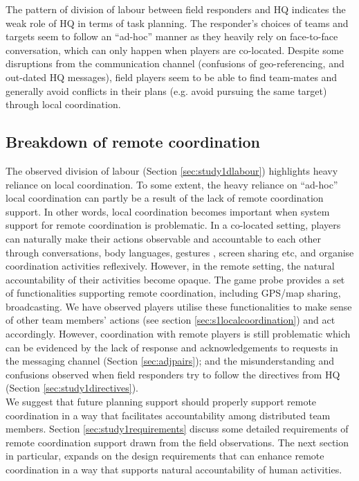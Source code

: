 The pattern of division of labour between field responders and HQ indicates the weak role of HQ in terms of task planning. The responder's choices of teams and targets seem to follow an ``ad-hoc'' manner as they heavily rely on face-to-face conversation, which can only happen when players are co-located. Despite some disruptions from the communication channel (confusions of geo-referencing, and out-dated HQ messages), field players seem to be able to find team-mates and generally avoid conflicts in their plans (e.g. avoid pursuing the same target) through local coordination. 


\subsection{Breakdown of remote coordination}\label{sec:study1breakdown}
The observed division of labour (Section \ref{sec:study1dlabour}) highlights heavy reliance on local coordination. To some extent, the heavy reliance on ``ad-hoc'' local coordination can partly be a result of the lack of remote coordination support. In other words, local coordination becomes important when system support for remote coordination is problematic. In a co-located setting, players can naturally make their actions observable and accountable to each other through conversations, body languages, gestures , screen sharing etc, and organise coordination activities reflexively. However, in the remote setting, the natural accountability of their activities become opaque. The game probe provides a set of functionalities supporting remote coordination, including GPS/map sharing, broadcasting. We have observed players utilise these functionalities to make sense of other team members' actions (see section \ref{sec:s1localcoordination}) and act accordingly. However, coordination with remote players is still problematic which can be evidenced by the lack of response and acknowledgements to requests in the messaging channel (Section \ref{sec:adjpairs}); and the misunderstanding and confusions observed when field responders try to follow the directives from HQ (Section \ref{sec:study1directives}).\\

We suggest that future planning support should properly support remote coordination in a way that facilitates accountability among distributed team members. Section \ref{sec:study1requirements} discuss some detailed requirements of remote coordination support drawn from the field observations. The next section in particular,  expands on the design requirements that can enhance remote coordination in a way that supports natural accountability of human activities.\\

